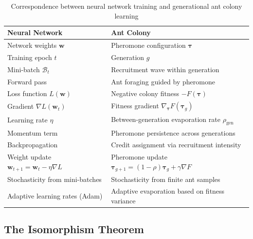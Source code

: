 \documentclass[12pt,letterpaper]{article}
\begin{document}
\begin{table}[htbp]
\centering
\caption{Correspondence between neural network training and generational ant colony learning}
\label{tab:gradient_isomorphism}
\begin{tabular}{ll}
\toprule
\textbf{Neural Network} & \textbf{Ant Colony} \\
\midrule
Network weights $\mathbf{w}$ & Pheromone configuration $\boldsymbol{\tau}$ \\
Training epoch $t$ & Generation $g$ \\
Mini-batch $\mathcal{B}_t$ & Recruitment wave within generation \\
Forward pass & Ant foraging guided by pheromone \\
Loss function $L(\mathbf{w})$ & Negative colony fitness $-F(\boldsymbol{\tau})$ \\
Gradient $\nabla L(\mathbf{w}_t)$ & Fitness gradient $\nabla_{\boldsymbol{\tau}} F(\boldsymbol{\tau}_g)$ \\
Learning rate $\eta$ & Between-generation evaporation rate $\rho_{\text{gen}}$ \\
Momentum term & Pheromone persistence across generations \\
Backpropagation & Credit assignment via recruitment intensity \\
Weight update $\mathbf{w}_{t+1} = \mathbf{w}_t - \eta \nabla L$ & Pheromone update $\boldsymbol{\tau}_{g+1} = (1-\rho)\boldsymbol{\tau}_g + \gamma \nabla F$ \\
Stochasticity from mini-batches & Stochasticity from finite ant samples \\
Adaptive learning rates (Adam) & Adaptive evaporation based on fitness variance \\
\bottomrule
\end{tabular}
\end{table}

\subsection{The Isomorphism Theorem}
\end{document}
